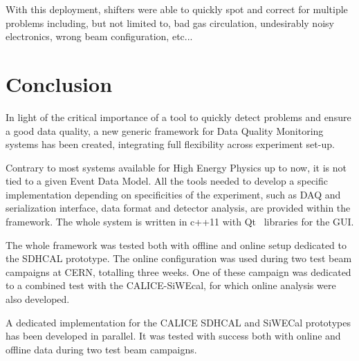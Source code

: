 \documentclass[conference]{IEEEtran}
\begin{document}
With this deployment, shifters were able to quickly spot and correct for multiple problems including, but not limited to, bad gas circulation, undesirably noisy electronics, wrong beam configuration, etc...

\section{Conclusion}
In light of the critical importance of a tool to quickly detect problems and ensure a good data quality, a new generic framework for Data Quality Monitoring systems has been created, integrating full flexibility across experiment set-up.

Contrary to most systems available for High Energy Physics up to now, it is not tied to a given Event Data Model. All the tools needed to develop a specific implementation depending on specificities of the experiment, such as DAQ and serialization interface, data format and detector analysis, are provided within the framework.
The whole system is written in c++11 with Qt~\cite{QT} libraries for the GUI.

The whole framework was tested both with offline and online setup dedicated to the SDHCAL prototype. The online configuration was used during two test beam campaigns at CERN, totalling three weeks. One of these campaign was dedicated to a combined test with the CALICE-SiWEcal, for which online analysis were also developed.

A dedicated implementation for the CALICE SDHCAL and SiWECal prototypes has been developed in parallel. It was tested with success both with online and offline data during two test beam campaigns.



%
%
\end{document}
